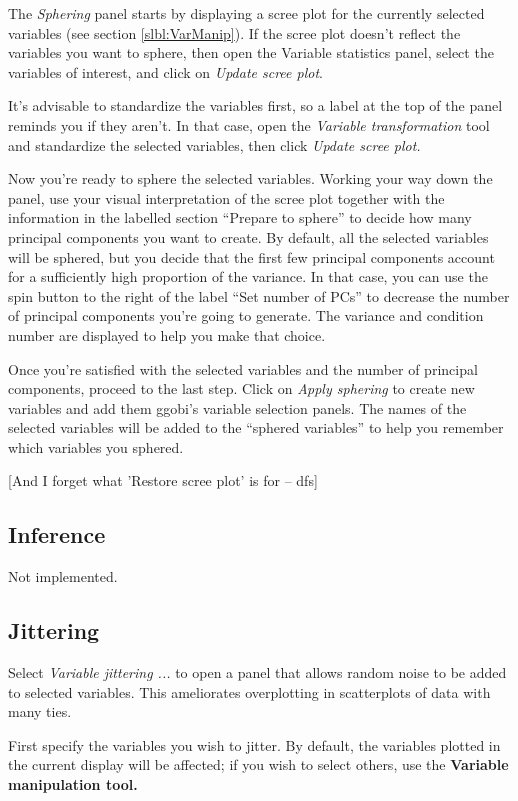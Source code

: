 \documentclass[11pt]{article}
\begin{document}
The {\em Sphering} panel starts by displaying a scree plot for the
currently selected variables (see section \ref{slbl:VarManip}).  If the
scree plot doesn't reflect the variables you want to sphere, then open
the Variable statistics panel, select the variables of interest, and
click on {\em Update scree plot}.

It's advisable to standardize the variables first, so a label at the top
of the panel reminds you if they aren't.  In that case, open the {\em
Variable transformation} tool and standardize the selected variables,
then click {\em Update scree plot.}

Now you're ready to sphere the selected variables.  Working your way down
the panel, use your visual interpretation of the scree plot together
with the information in the labelled section ``Prepare to sphere'' to
decide how many principal components you want to create.  By default,
all the selected variables will be sphered, but you decide that the first
few principal components account for a sufficiently high proportion of
the variance.  In that case, you can use the spin button to the right
of the label ``Set number of PCs'' to decrease the number of principal
components you're going to generate.  The variance and condition number
are displayed to help you make that choice.

Once you're satisfied with the selected variables and the number of
principal components, proceed to the last step.  Click on {\em Apply
sphering} to create new variables and add them ggobi's variable selection
panels.  The names of the selected variables will be added to the
``sphered variables'' to help you remember which variables you sphered.

[And I forget what 'Restore scree plot' is for -- dfs]

\subsection{Inference}

Not implemented.

\subsection{Jittering}

Select {\em Variable jittering ...} to open a panel that allows
random noise to be added to selected variables.  This ameliorates
overplotting in scatterplots of data with many ties.

First specify the variables you wish to jitter.  By default, the
variables plotted in the current display will be affected; if you
wish to select others, use the {\bf Variable manipulation tool.}
\end{document}
